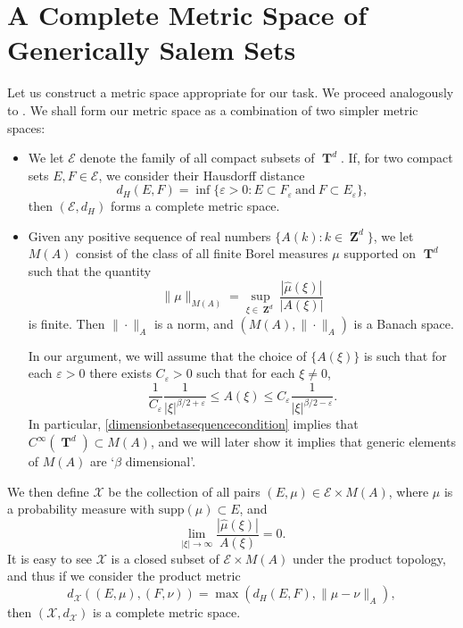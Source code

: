 \documentclass[12pt,reqno]{article}
\DeclareMathOperator{\ZZ}{\mathbf{Z}}
\DeclareMathOperator{\TT}{\mathbf{T}}
\begin{document}
\section{A Complete Metric Space of Generically Salem Sets}

Let us construct a metric space appropriate for our task. We proceed analogously to \cite{Korner2}. We shall form our metric space as a combination of two simpler metric spaces:
%
\begin{itemize}
    \item We let $\mathcal{E}$ denote the family of all compact subsets of $\TT^d$. If, for two compact sets $E,F \in \mathcal{E}$, we consider their Hausdorff distance
    \[ d_H(E,F) = \inf \{ \varepsilon > 0 : E \subset F_\varepsilon\ \text{and}\ F \subset E_\varepsilon \}, \]
    then $(\mathcal{E},d_H)$ forms a complete metric space.

    \item Given any positive sequence of real numbers $\{ A(k) : k \in \ZZ^d \}$, we let $M(A)$ consist of the class of all finite Borel measures $\mu$ supported on $\TT^d$ such that the quantity
    \[ \| \mu \|_{M(A)} = \sup_{\xi \in \ZZ^d} \frac{|\widehat{\mu}(\xi)|}{|A(\xi)|} \]
    is finite. Then $\| \cdot \|_A$ is a norm, and $(M(A), \| \cdot \|_A)$ is a Banach space.

    In our argument, we will assume that the choice of $\{ A(\xi) \}$ is such that for each $\varepsilon > 0$ there exists $C_\varepsilon > 0$ such that for each $\xi \neq 0$,
    \begin{equation} \label{dimensionbetasequencecondition}
        \frac{1}{C_\varepsilon} \frac{1}{|\xi|^{\beta/2 + \varepsilon}} \leq A(\xi) \leq C_\varepsilon \frac{1}{|\xi|^{\beta/2 - \varepsilon}}.
    \end{equation}
    In particular, \eqref{dimensionbetasequencecondition} implies that $C^\infty(\TT^d) \subset M(A)$, and we will later show it implies that generic elements of $M(A)$ are `$\beta$ dimensional'.
\end{itemize}
%
We then define $\mathcal{X}$ be the collection of all pairs $(E,\mu) \in \mathcal{E} \times M(A)$, where $\mu$ is a probability measure with $\text{supp}(\mu) \subset E$, and
%
\[ \lim_{|\xi| \to \infty} \frac{|\widehat{\mu}(\xi)|}{A(\xi)} = 0. \]
%
It is easy to see $\mathcal{X}$ is a closed subset of $\mathcal{E} \times M(A)$ under the product topology, and thus if we consider the product metric
%
\[ d_{\mathcal{X}}((E,\mu),(F,\nu)) = \max \left( d_H(E,F), \| \mu - \nu \|_A \right), \]
%
then $(\mathcal{X},d_\mathcal{X})$ is a complete metric space.
\end{document}
